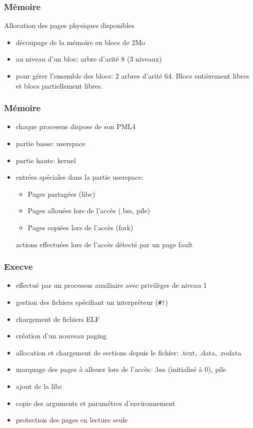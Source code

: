 \documentclass[10pt,a4paper]{beamer}
\begin{document}
\begin{frame}
\begin{tikzpicture}
  \end{tikzpicture}
\end{frame}

\begin{frame}
  \frametitle{Mémoire}
  Allocation des pages physiques disponibles

  \begin{itemize}
  \item découpage de la mémoire en blocs de 2Mo
  \item au niveau d'un bloc: arbre d'arité 8 (3 niveaux)
  \item pour gérer l'ensemble des blocs:
    2 arbres d'arité 64. Blocs entièrement libres et blocs partiellement libres.
  \end{itemize}
\end{frame}

\begin{frame}
  \frametitle{Mémoire}

  \begin{itemize}
  \item chaque processus dispose de son PML4
  \item partie basse: userspace
  \item partie haute: kernel
  \item entrées spéciales dans la partie userspace:
    \begin{itemize}
    \item Pages partagées (libc)
    \item Pages allouées lors de l'accès (.bss, pile)
    \item Pages copiées lors de l'accès (fork)
    \end{itemize}
    actions effectuées lors de l'accès détecté par un page fault
  \end{itemize}
\end{frame}

\begin{frame}
  \frametitle{Execve}
  \begin{itemize}
  \item effectué par un processus auxiliaire avec privilèges de niveau 1
  \item gestion des fichiers spécifiant un interpréteur (\texttt{\#!})
  \item chargement de fichiers ELF
  \item création d'un nouveau paging
  \item allocation et chargement de sections depuis le fichier: .text, .data, .rodata
  \item marquage des pages à allouer lors de l'accès: .bss (initialisé à 0), pile
  \item ajout de la libc
  \item copie des arguments et paramêtres d'environnement
  \item protection des pages en lecture seule
  \end{itemize}
\end{frame}
\end{document}
